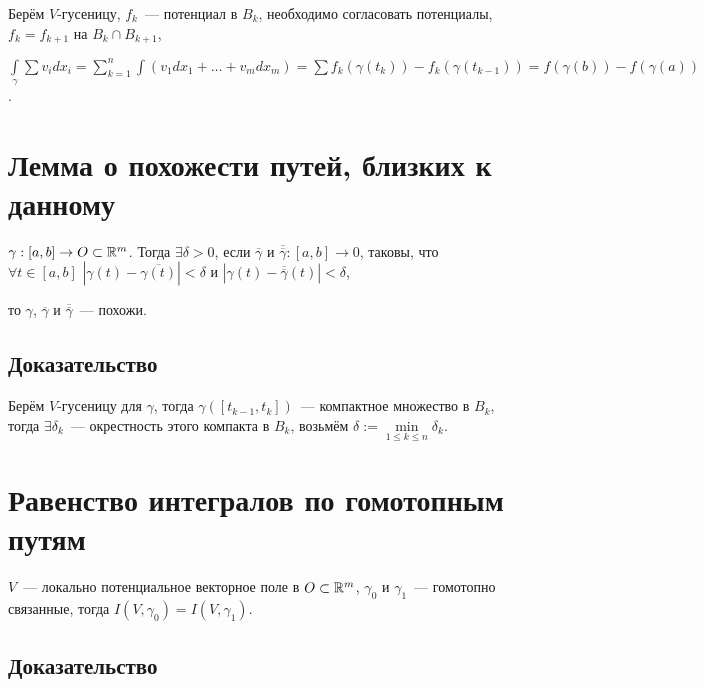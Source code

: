 \documentclass{article}
\begin{document}
            Берём $V$-гусеницу, $f_k$~--- потенциал в $B_k$, необходимо согласовать потенциалы, $f_k = f_{k + 1}$ на $B_k \cap B_{k + 1}$,
            
            $\int\limits_{\gamma} \sum v_i dx_i = \sum\limits^n_{k = 1} \int \left( v_1 dx_1 + \ldots + v_m dx_m \right) = \sum f_k \left( \gamma(t_k) \right) - f_k \left( \gamma (t_{k - 1}) \right) = f \left( \gamma(b) \right) - f \left( \gamma(a) \right)$.
            
    \newpage
    
    \section{Лемма о похожести путей, близких к данному}
    
        $\gamma : [a, b] \rightarrow O \subset \mathbb{R}^m$. Тогда $\exists \delta > 0$, если $\overline{\gamma}$ и $\overline{\overline{\gamma}} : [a, b] \rightarrow 0$, таковы, что $\forall t \in [a, b]$ $|\gamma(t) - \overline{\gamma(t)}| < \delta$ и $|\gamma(t) - \overline{\overline{\gamma}}(t)| < \delta$,
        
        то $\gamma$, $\overline{\gamma}$ и $\overline{\overline{\gamma}}$~--- похожи.
        
        \subsection{Доказательство}
        
            Берём $V$-гусеницу для $\gamma$, тогда $\gamma \left( [t_{k - 1}, t_k ] \right)$~--- компактное множество в $B_k$, тогда $\exists \delta_k$~--- окрестность этого компакта в $B_k$, возьмём $\delta := \min\limits_{1 \leq k \leq n} \delta_k$.
            
    \newpage
    
    \section{Равенство интегралов по гомотопным путям}
    
        $V$~--- локально потенциальное векторное поле в $O \subset \mathbb{R}^m$, $\gamma_0$ и $\gamma_1$~--- гомотопно связанные, тогда $I(V, \gamma_0) = I(V, \gamma_1)$.
        
        \subsection{Доказательство}
        
\end{document}
